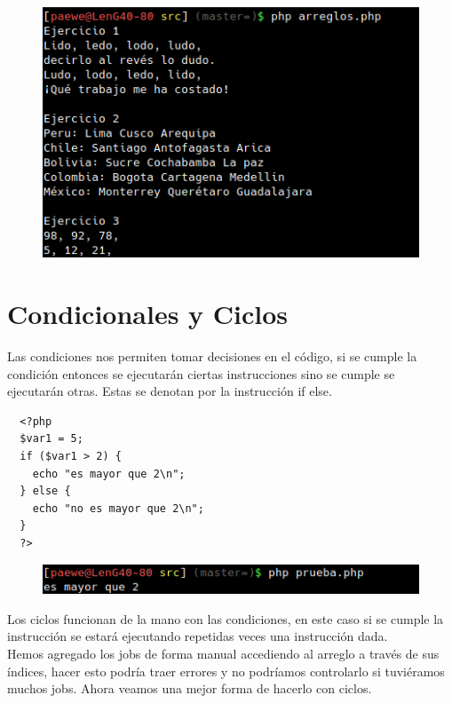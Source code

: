 \documentclass{article}
\begin{document}
\begin{figure}[h!]
  \centering
  \includegraphics[scale=0.75]{./Pictures/021_ejercicios.png}
\end{figure}


\section{Condicionales y Ciclos}%
Las condiciones nos permiten tomar decisiones en el código, si se cumple la
condición entonces se ejecutarán ciertas instrucciones sino se cumple se
ejecutarán otras. Estas se denotan por la instrucción if else.\\

\begin{verbatim}
  <?php
  $var1 = 5;
  if ($var1 > 2) {
    echo "es mayor que 2\n";
  } else {
    echo "no es mayor que 2\n";
  }
  ?>
\end{verbatim}

\begin{figure}[h!]
  \centering
  \includegraphics[scale=0.75]{./Pictures/031_condicional.png}
\end{figure}

Los ciclos funcionan de la mano con las condiciones, en este caso si se cumple
la instrucción se estará ejecutando repetidas veces una instrucción dada.\\

Hemos agregado los jobs de forma manual accediendo al arreglo a través de sus
índices, hacer esto podría traer errores y no podríamos controlarlo si
tuviéramos muchos jobs. Ahora veamos una mejor forma de hacerlo con ciclos.\\
\end{document}
